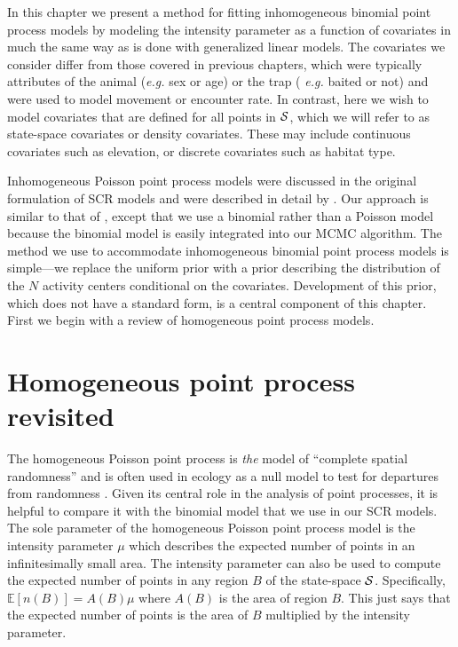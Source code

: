 In this chapter we present a method
for fitting inhomogeneous binomial point process models by modeling
the intensity parameter as a function of
covariates in much the same way as is done with generalized linear
models. The covariates we consider differ
from those covered in previous chapters, which were typically
attributes of the animal ({\it e.g.} sex or age) or the trap ({\it
  e.g.} baited or not) and were used to model movement or encounter
rate. In contrast, here we wish to
model covariates that are defined for all points in
$\cal{S}$, which we will refer to as
state-space covariates or density covariates. These may
include continuous covariates such as elevation, or discrete
covariates such as habitat type.

Inhomogeneous Poisson point process models were discussed in the original
formulation of SCR models \citep{efford:2004} and were described in
detail by \citet{borchers_efford:2008}. Our approach is
similar to that of \citet{borchers_efford:2008}, except that we use a binomial
rather than a Poisson model because the binomial model is
easily integrated into our MCMC algorithm.  %
The method we use to accommodate inhomogeneous binomial point process
models %
is simple---we
replace the uniform prior with a prior describing the
distribution of the $N$ activity centers conditional on the
covariates. Development of this prior, which does not have a
standard form, is a central component of this chapter. First we
begin with a review of homogeneous point process models.


\section{Homogeneous point process revisited}

The homogeneous Poisson point process is \textit{the} model of ``complete
spatial randomness'' and is often used in ecology as a null model
to test for departures from randomness
\citep{diggle:2003,illian_etal:2008}. Given its central role in the
analysis of point processes, it is helpful to compare it with
the binomial model that we use in our SCR models. The sole parameter
of the homogeneous Poisson point process model is the
intensity parameter $\mu$ which describes the expected number
of points in an infinitesimally small area. %
The intensity parameter can also be used to compute the expected number of points
in any region $B$ of the state-space $\cal{S}$. Specifically,
$\mathbb{E}[n(B)] = A(B)\mu$ where $A(B)$ is the area of region $B$.
This just says that
the expected number of points is the area of $B$
multiplied by the intensity parameter.

